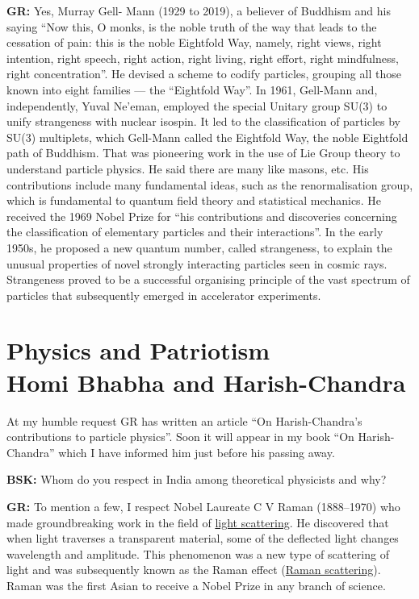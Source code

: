 \textbf{GR:} Yes, Murray Gell- Mann (1929 to 2019), a believer of Buddhism and his saying  ``Now this, O monks, is the noble truth of the way that leads to the cessation of pain: this is the noble Eightfold Way, namely, right views, right intention, right speech, right action, right living, right effort, right mindfulness, right concentration”. He devised a scheme to codify particles, grouping all those known into eight families — the “Eightfold Way”. In 1961, Gell-Mann and, independently, Yuval Ne’eman, employed the special Unitary group SU(3) to unify strangeness with nuclear isospin. It led to the classification of particles by SU(3) multiplets, which Gell-Mann called the Eightfold Way, the noble Eightfold path of Buddhism. That was pioneering work in the use of Lie Group theory to understand particle physics. He said there are many like masons, etc. His contributions include many   fundamental ideas, such as the renormalisation group, which is fundamental to quantum field theory and statistical mechanics.  He received the 1969 Nobel Prize for “his contributions and discoveries concerning the classification of elementary particles and their interactions”. In the early 1950s, he proposed a new quantum number, called strangeness, to explain the unusual properties of novel strongly interacting particles seen in cosmic rays. Strangeness proved to be a successful organising principle of the vast spectrum of particles that subsequently emerged in accelerator experiments.

\section*{Physics and Patriotism\\ {\large Homi Bhabha and Harish-Chandra}}

At my humble request GR has written an article \cite{chap17-key03GR} “On Harish-Chandra's contributions to particle physics”. Soon it will appear in my book “On Harish-Chandra” which I have informed him just before his passing away.

\textbf{BSK:} Whom do you respect in India among theoretical physicists and why?

\textbf{GR:} To mention a few, I respect Nobel Laureate C V Raman (1888--1970) who made groundbreaking work in the field of \underline{light scattering}. He discovered that when light traverses a transparent material, some of the deflected light changes wavelength and amplitude. This phenomenon was a new type of scattering of light and was subsequently known as the Raman effect (\underline{Raman scattering}). Raman was the first Asian to receive a Nobel Prize in any branch of science.

